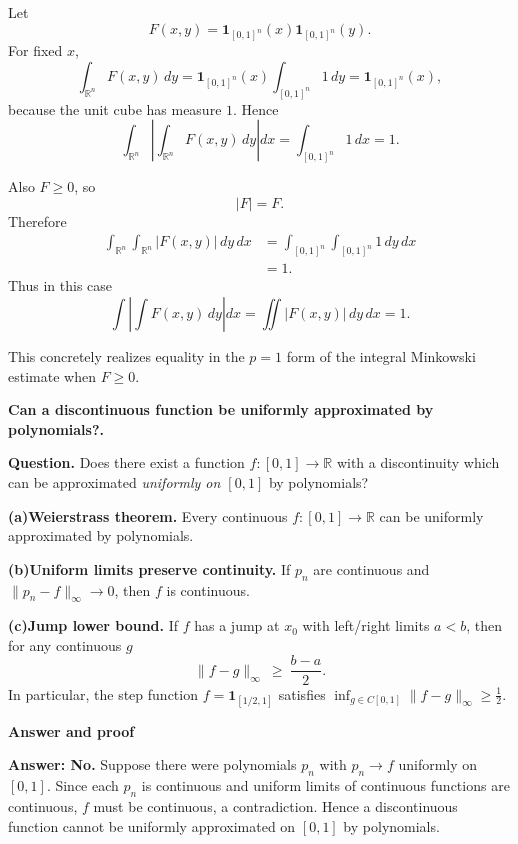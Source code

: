\begin{solution}
Let
\[
F(x,y)
=
\mathbf1_{[0,1]^n}(x)
\mathbf1_{[0,1]^n}(y).
\]
For fixed \(x\),
\[
\int_{\mathbb R^n}F(x,y)\,dy
=
\mathbf1_{[0,1]^n}(x)
\int_{[0,1]^n}1\,dy
=
\mathbf1_{[0,1]^n}(x),
\]
because the unit cube has measure \(1\). Hence
\[
\int_{\mathbb R^n}
\left|
\int_{\mathbb R^n}F(x,y)\,dy
\right|dx
=
\int_{[0,1]^n}1\,dx
=
1.
\]

Also \(F\ge0\), so
\[
|F|=F.
\]
Therefore
\[
\begin{aligned}
\int_{\mathbb R^n}\int_{\mathbb R^n}|F(x,y)|\,dy\,dx
&=
\int_{[0,1]^n}\int_{[0,1]^n}1\,dy\,dx\\
&=1.
\end{aligned}
\]
Thus in this case
\[
\boxed{
\int
\left|
\int F(x,y)\,dy
\right|dx
=
\iint|F(x,y)|\,dy\,dx
=
1.
}
\]

This concretely realizes equality in the \(p=1\) form of the integral Minkowski estimate
when \(F\ge0\).
\end{solution}


\begin{problem}[CP-II-0222]
\label{prob:cp-ii-0222}
\textbf{Can a discontinuous function be uniformly approximated by polynomials?.}

\hspace*{1.5em}\textbf{Question.}
Does there exist a function $f:[0,1]\to\mathbb{R}$ with a discontinuity which can be approximated
\emph{uniformly on $[0,1]$} by polynomials?

\bigskip

 \setlength{\itemsep}{0.6em}
	\par\smallskip\noindent\textbf{(a)}\quad \textbf{Weierstrass theorem.} Every continuous $f:[0,1]\to\mathbb{R}$ can be uniformly approximated by polynomials.
	\par\smallskip\noindent\textbf{(b)}\quad \textbf{Uniform limits preserve continuity.}
	If $p_n$ are continuous and $\|p_n-f\|_\infty\to 0$, then $f$ is continuous.
	\par\smallskip\noindent\textbf{(c)}\quad \textbf{Jump lower bound.} If $f$ has a jump at $x_0$ with left/right limits $a<b$, then for any continuous $g$
	\[
	\|f-g\|_\infty \ \ge\ \frac{b-a}{2}.
	\]
	In particular, the step function $f=\mathbf{1}_{[1/2,1]}$ satisfies
	$\inf_{g\in C[0,1]}\|f-g\|_\infty\ge \tfrac12$.

\bigskip
\end{problem}

\begin{solution}

\par\medskip\noindent\textbf{Answer and proof}\par\smallskip


\noindent\textbf{Answer: No.}
Suppose there were polynomials $p_n$ with $p_n\to f$ uniformly on $[0,1]$.
Since each $p_n$ is continuous and uniform limits of continuous functions are continuous,
$f$ must be continuous, a contradiction. Hence a discontinuous function cannot be uniformly
approximated on $[0,1]$ by polynomials.

\bigskip
\end{solution}

